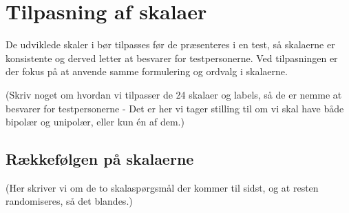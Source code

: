 \chapter{Tilpasning af skalaer}
\label{TestAfSkalaTilpasningAfSkalaer}
%
De udviklede skaler i  bør tilpasses før de præsenteres i en test, så skalaerne er konsistente og derved letter at besvarer for testpersonerne. \blankline
%
Ved tilpasningen er der fokus på at anvende samme formulering og ordvalg i skalaerne.

(Skriv noget om hvordan vi tilpasser de 24 skalaer og labels, så de er nemme at besvarer for testpersonerne - Det er her vi tager stilling til om vi skal have både bipolær og unipolær, eller kun én af dem.) 

\section{Rækkefølgen på skalaerne}
(Her skriver vi om de to skalaspørgsmål der kommer til sidst, og at resten randomiseres, så det blandes.)